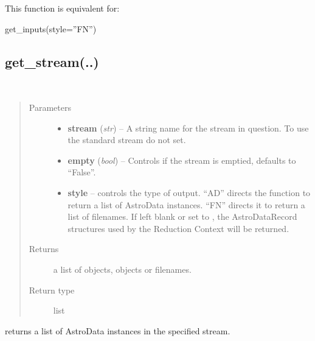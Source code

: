 \documentclass[letterpaper,10pt,english]{sphinxmanual}
\begin{document}
\begin{fulllineitems}
\label{chapter_ReductionContextClass:astrodata.RecipeManager.ReductionContext.get_inputs_as_filenames}
This function is equivalent for:

get\_inputs(style=''FN'')

\end{fulllineitems}



\subsection{get\_stream(..)}
\label{chapter_ReductionContextClass:get-stream}

\begin{fulllineitems}
\label{chapter_ReductionContextClass:astrodata.RecipeManager.ReductionContext.get_stream}~\begin{quote}\begin{description}
\item[{Parameters}] \leavevmode\begin{itemize}
\item {} 
\textbf{stream} (\emph{str}) -- A string name for the stream in question.  
To use the standard stream do not set.

\item {} 
\textbf{empty} (\emph{bool}) -- Controls if the stream is
emptied, defaults to ``False''.

\item {} 
\textbf{style} -- controls the type of output. ``AD'' directs the function
to return a list
of AstroData instances. ``FN'' directs it to return a list of filenames.
If left blank or set to , the AstroDataRecord structures used
by the Reduction Context will be returned.

\end{itemize}

\item[{Returns}] \leavevmode
a list of  objects,  objects or filenames.

\item[{Return type}] \leavevmode
list

\end{description}\end{quote}

 returns a list of AstroData instances in the specified stream.

\end{fulllineitems}
\end{document}
